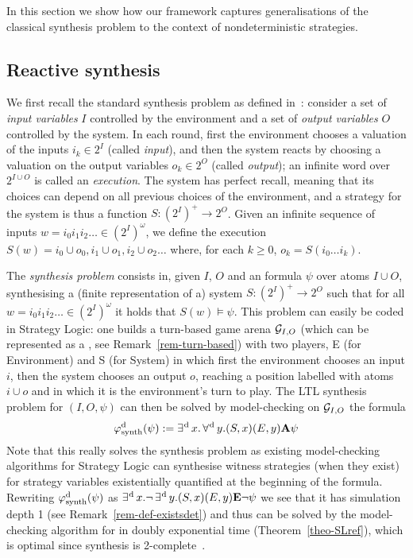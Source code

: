 In this section we show how our framework captures generalisations of
the classical \LTL synthesis problem to the context of nondeterministic strategies.

\subsection{Reactive synthesis}
\label{sec-ltl-synth}

We first recall the standard \LTL synthesis problem as defined
in~\cite{pnueli1989synthesisshort}: consider a set of \emph{input
  variables} $I$ controlled by the environment and a set of
\emph{output variables} $O$ controlled by the system. In each round,
first the environment chooses a valuation of the inputs $i_k\in 2^I$
(called \emph{input}), and then the system reacts by choosing a
valuation on the output variables $o_k\in 2^O$ (called \emph{output});
an infinite word over $2^{I\cup O}$ is called an
\emph{execution}. The system has perfect recall, meaning that its
choices can depend on all previous choices of the environment, and a
strategy for the system is thus a function $S:(2^I)^+\to 2^O$. Given
an infinite sequence of inputs $w=i_0i_1i_2\ldots \in (2^I)^\omega$, we
define the execution $S(w)=i_0\cup o_0, i_1\cup o_1, i_2\cup o_2\ldots$ where,
for each $k\geq 0$, $o_k=S(i_0\ldots i_k)$.

The \emph{\LTL synthesis problem} consists in,
given $I$, $O$ and an \LTL formula $\psi$ over atoms $I\cup O$,
synthesising a (finite representation of a) system $S:(2^I)^+\to 2^O$ such
that for all $w=i_0i_1i_2\ldots\in (2^I)^\omega$ it holds that $S(w)\models\psi$.
This problem can easily
be coded in Strategy Logic: one builds a turn-based game arena $\CGS_{I,O}$ (which
can be represented as a \CGS, see Remark~\ref{rem-turn-based}) with
two players, E (for Environment) and S (for System) in
which first the environment chooses an input $i$, then the system chooses
an output $o$, reaching a position labelled with atoms $i\cup o$ and in which it is
the environment's turn to play. The LTL synthesis problem for $(I,O,\psi)$ can
then be solved by model-checking on $\CGS_{I,O}$ the \SLref formula
\[\varphi^{\text{d}}_{\text{synth}}(\psi):=\operatorname*{\exists^{\hskip.5pt\text{d}}} x.   \operatorname*{\forall^{\hskip.5pt\text{d}}} y.
 (S,x)(E,y) {\bf A} \psi\]
 Note that this really solves the synthesis
problem as existing model-checking algorithms for Strategy Logic can
synthesise  witness strategies (when they exist) for strategy variables existentially
quantified at the beginning of the formula.
Rewriting $\varphi^{\text{d}}_{\text{synth}}(\psi)$ as $\operatorname*{\exists^{\hskip.5pt\text{d}}} x. \neg  \operatorname*{\exists^{\hskip.5pt\text{d}}}  y.
 (S,x)(E,y) {\bf E} \neg \psi$
we see that it has simulation depth 1 (see
Remark~\ref{rem-def-existsdet}) and thus can be solved by the
model-checking algorithm for \SLref in doubly
exponential time (Theorem~\ref{theo-SLref}), which is optimal since
\LTL synthesis is 2\EXPTIME-complete~\cite{pnueli1989synthesisshort}.


